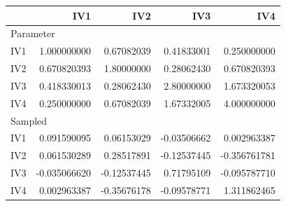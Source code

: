 \documentclass[ShortAfour,times,sageapa]{sagej}
\begin{document}
%	
	
	\smallskip
	
	\begin{longtable}{l|rrrr}
		\toprule
		\multicolumn{1}{l}{} & IV1 & IV2 & IV3 & IV4 \\ 
		\midrule
		\multicolumn{5}{l}{Parameter} \\ 
		\midrule
		IV1 & 1.000000000 & 0.67082039 & 0.41833001 & 0.250000000 \\ 
		IV2 & 0.670820393 & 1.80000000 & 0.28062430 & 0.670820393 \\ 
		IV3 & 0.418330013 & 0.28062430 & 2.80000000 & 1.673320053 \\ 
		IV4 & 0.250000000 & 0.67082039 & 1.67332005 & 4.000000000 \\ 
		\midrule
		\multicolumn{5}{l}{Sampled} \\ 
		\midrule
		IV1 & 0.091590095 & 0.06153029 & -0.03506662 & 0.002963387 \\ 
		IV2 & 0.061530289 & 0.28517891 & -0.12537445 & -0.356761781 \\ 
		IV3 & -0.035066620 & -0.12537445 & 0.71795109 & -0.095787710 \\ 
		IV4 & 0.002963387 & -0.35676178 & -0.09578771 & 1.311862465 \\ 
		\bottomrule
	\end{longtable}
	
\end{document}
